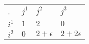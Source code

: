\begin{center}
    \begin{tabular}{llll}
    .                          & $j^1$    & $j^2$                      & $j^3$                           \\ \cline{2-4}
    \multicolumn{1}{l|}{$i^1$} & $1$ & $2$          & \multicolumn{1}{l|}{$0$} \\
    \multicolumn{1}{l|}{$i^2$} & $0$ & $2+\epsilon$ & \multicolumn{1}{l|}{$2+2\epsilon$} \\ \cline{2-4}
    \end{tabular}
\end{center}